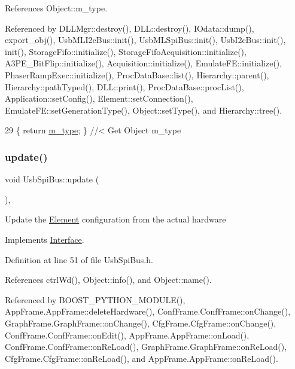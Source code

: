 References Object\+::m\+\_\+type.



Referenced by D\+L\+L\+Mgr\+::destroy(), D\+L\+L\+::destroy(), I\+Odata\+::dump(), export\+\_\+obj(), Usb\+M\+L\+I2c\+Bus\+::init(), Usb\+M\+L\+Spi\+Bus\+::init(), Usb\+I2c\+Bus\+::init(), init(), Storage\+Fifo\+::initialize(), Storage\+Fifo\+Acquisition\+::initialize(), A3\+P\+E\+\_\+\+Bit\+Flip\+::initialize(), Acquisition\+::initialize(), Emulate\+F\+E\+::initialize(), Phaser\+Ramp\+Exec\+::initialize(), Proc\+Data\+Base\+::list(), Hierarchy\+::parent(), Hierarchy\+::path\+Typed(), D\+L\+L\+::print(), Proc\+Data\+Base\+::proc\+List(), Application\+::set\+Config(), Element\+::set\+Connection(), Emulate\+F\+E\+::set\+Generation\+Type(), Object\+::set\+Type(), and Hierarchy\+::tree().


\begin{DoxyCode}
29 \{ \textcolor{keywordflow}{return} \hyperlink{classObject_a457a600fe8c00eb1034374f75110a78c}{m\_type};       \} \textcolor{comment}{//< Get Object m\_type}
\end{DoxyCode}
\mbox{\label{classUsbSpiBus_a3e26195827351bf88db56dafd1e7de26}} 
\subsubsection{\texorpdfstring{update()}{update()}}
{\footnotesize\ttfamily void Usb\+Spi\+Bus\+::update (\begin{DoxyParamCaption}{ }\end{DoxyParamCaption})\hspace{0.3cm}{\ttfamily [inline]}, {\ttfamily [virtual]}}

Update the \hyperlink{classElement}{Element} configuration from the actual hardware 

Implements \hyperlink{classInterface_a30e71ffbe36091df9f7c0838dd4b60d2}{Interface}.



Definition at line 51 of file Usb\+Spi\+Bus.\+h.



References ctrl\+Wd(), Object\+::info(), and Object\+::name().



Referenced by B\+O\+O\+S\+T\+\_\+\+P\+Y\+T\+H\+O\+N\+\_\+\+M\+O\+D\+U\+L\+E(), App\+Frame.\+App\+Frame\+::delete\+Hardware(), Conf\+Frame.\+Conf\+Frame\+::on\+Change(), Graph\+Frame.\+Graph\+Frame\+::on\+Change(), Cfg\+Frame.\+Cfg\+Frame\+::on\+Change(), Conf\+Frame.\+Conf\+Frame\+::on\+Edit(), App\+Frame.\+App\+Frame\+::on\+Load(), Conf\+Frame.\+Conf\+Frame\+::on\+Re\+Load(), Graph\+Frame.\+Graph\+Frame\+::on\+Re\+Load(), Cfg\+Frame.\+Cfg\+Frame\+::on\+Re\+Load(), and App\+Frame.\+App\+Frame\+::on\+Re\+Load().


